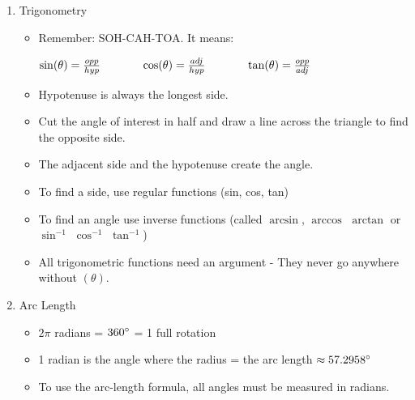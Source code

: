 \documentclass[letterpaper, 12pt]{article}
\begin{document}
\begin{enumerate}
\begin{itemize}
\begin{itemize}
				
			\end{itemize}
		\end{itemize}
	\vspace{2in} 
	\item Trigonometry
	\begin{itemize}
		\item Remember: SOH-CAH-TOA.  It means:
		\begin{center}
			$\sin(\theta) = \frac{opp}{hyp} \hspace{0.5in} \cos(\theta) = \frac{adj}{hyp} \hspace{0.5in} \tan(\theta) = \frac{opp}{adj}	$	
		\end{center}
	\item Hypotenuse is always the longest side.
	\item Cut the angle of interest in half and draw a line across the triangle to find the opposite side.
	\item The adjacent side and the hypotenuse create the angle.
	\item To find a side, use regular functions (sin, cos, tan)
	\item To find an angle use inverse functions (called $\arcsin$, $\arccos$ $\arctan$ or $\sin^{-1}$ $\cos^{-1}$ $\tan^{-1}$)
	\item All trigonometric functions need an argument - They never go anywhere without $(\theta)$.	
	\end{itemize}
	
	\item Arc Length
	\begin{itemize}
		\item $2\pi $ radians = $360 \degree $  = 1 full rotation
		\item 1 radian is the angle where the radius = the arc length $\approx 57.2958\degree$
		\item To use the arc-length formula, all angles must be measured in radians.
	\end{itemize}
\end{enumerate}
 
\end{document}

